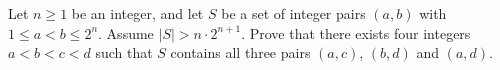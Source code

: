 Let $n \geq 1$ be an integer, and let $S$ be a set of integer pairs $(a,b)$ with $1 \leq a < b \leq 2^n$. Assume $|S| > n \cdot 2^{n+1}$. Prove that there exists four integers $a < b < c < d$ such that $S$ contains all three pairs $(a,c)$, $(b,d)$ and $(a,d)$.